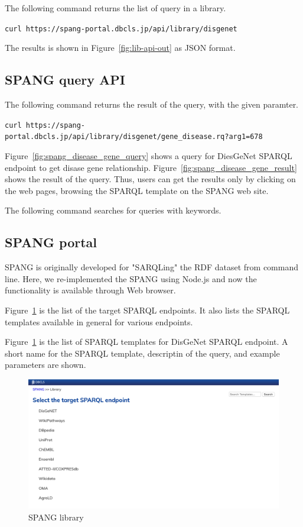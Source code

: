 \documentclass[runningheads]{llncs}
\begin{document}
The following command returns the list of query in a library.

\texttt{curl https://spang-portal.dbcls.jp/api/library/disgenet}

The results is shown in Figure~\ref{fig:lib-api-out} as JSON format.

\subsection{SPANG query API}

The following command returns the result of the query, with the given paramter.

\texttt{curl https://spang-portal.dbcls.jp/api/library/disgenet/gene\_disease.rq?arg1=678}



Figure~\ref{fig:spang_disease_gene_query} shows a query for DiesGeNet SPARQL endpoint to get disase gene relationship. 
Figure~\ref{fig:spang_disease_gene_result} shows the result of the query. Thus, users can get the results only by clicking on the web pages, browsing the SPARQL template on the SPANG web site.


The following command searches for queries with keywords.


\subsection{SPANG portal}
SPANG is originally developed for "SARQLing" the RDF dataset from command line. Here, we re-implemented the SPANG using Node.js and now the functionality is available through Web browser. 


Figure~\ref{fig:spang_lib} is the list of the target SPARQL endpoints. It also lists the SPARQL templates available in general for various endpoints.

Figure~\ref{fig:spang_lib} is the list of SPARQL templates for DisGeNet SPARQL endpoint.
A short name for the SPARQL template, descriptin of the query, and example parameters are shown.


\begin{figure}
\center
\includegraphics[width=1.0\textwidth]{spang_lib.png}
\caption{SPANG library}
\label{fig:spang_lib}
\end{figure}
\end{document}
